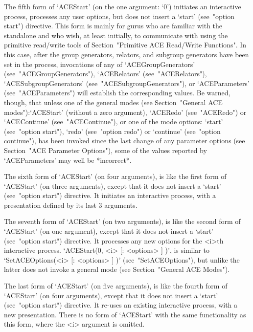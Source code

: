 The fifth form of `ACEStart' (on the one argument: `0')  initiates  an
interactive {\ACE} process, processes any user options, but  does  not
insert a `start' (see~"option start") directive. This form  is  mainly
for gurus who are familiar with the {\ACE} standalone and who wish, at
least initially,  to  communicate  with  {\ACE}  using  the  primitive
read/write tools of  Section~"Primitive ACE Read/Write Functions".  In
this  case,  after  the  group  generators,  relators,  and   subgroup
generators have been set in the {\ACE} process, invocations of any  of
`ACEGroupGenerators'     (see~"ACEGroupGenerators"),     `ACERelators'
(see~"ACERelators"),                           `ACESubgroupGenerators'
(see~"ACESubgroupGenerators"),           or            `ACEParameters'
(see~"ACEParameters") will establish the corresponding {\GAP}  values.
Be warned, though, that unless one of the general  {\ACE}  modes  (see
Section~"General ACE modes"):`ACEStart'  (without  a  zero  argument),
`ACERedo' (see~"ACERedo") or `ACEContinue' (see~"ACEContinue"), or one
of the mode options: `start' (see~"option start"), `redo' (see~"option
redo") or `continue' (see~"option continue"), has been  invoked  since
the last change of any parameter options (see  Section~"ACE  Parameter
Options"), some of the values reported by `ACEParameters' may well  be
*incorrect*.

The sixth form of `ACEStart' (on four arguments), is  like  the  first
form of `ACEStart' (on three  arguments),  except  that  it  does  not
insert a `start'  (see~"option  start")  directive.  It  initiates  an
interactive {\ACE} process, with a presentation defined by its last  3
arguments.

The seventh form of `ACEStart' (on two arguments), is like the  second
form of `ACEStart' (on one argument), except that it does not insert a
`start' (see~"option start") directive. It processes any  new  options
for  the  <i>th  interactive  {\ACE}  process.  `ACEStart(0,  <i>   [:
<options> ] )', is similar to `SetACEOptions(<i>  [:  <options>  ]  )'
(see~"SetACEOptions"), but unlike the latter does not invoke a general
mode (see Section~"General ACE Modes").

The last form of `ACEStart' (on five arguments), is  like  the  fourth
form of `ACEStart' (on four arguments), except that it does not insert
a `start' (see~"option  start")  directive.  It  re-uses  an  existing
interactive {\ACE} process, with a new presentation. There is no  form
of `ACEStart' with the same functionality as this form, where the  <i>
argument is omitted.

